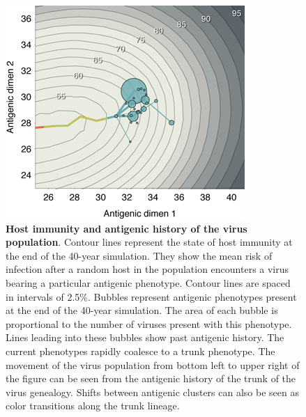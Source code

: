 \documentclass[11pt,oneside,letterpaper]{article}
\begin{document}
\begin{figure}[H]
	\centering
	\includegraphics{figures/immunity}
	\caption{\textbf{Host immunity and antigenic history of the virus population}.  Contour lines represent the state of host immunity at the end of the 40-year simulation.  They show the mean risk of infection after a random host in the population encounters a virus bearing a particular antigenic phenotype.  Contour lines are spaced in intervals of 2.5\%. Bubbles represent antigenic phenotypes present at the end of the 40-year simulation.  The area of each bubble is proportional to the number of viruses present with this phenotype.  Lines leading into these bubbles show past antigenic history.  The current phenotypes rapidly coalesce to a trunk phenotype.  The movement of the virus population from bottom left to upper right of the figure can be seen from the antigenic history of the trunk of the virus genealogy. Shifts between antigenic clusters can also be seen as color transitions along the trunk lineage.}
	\label{immunity}
\end{figure}
\end{document}
